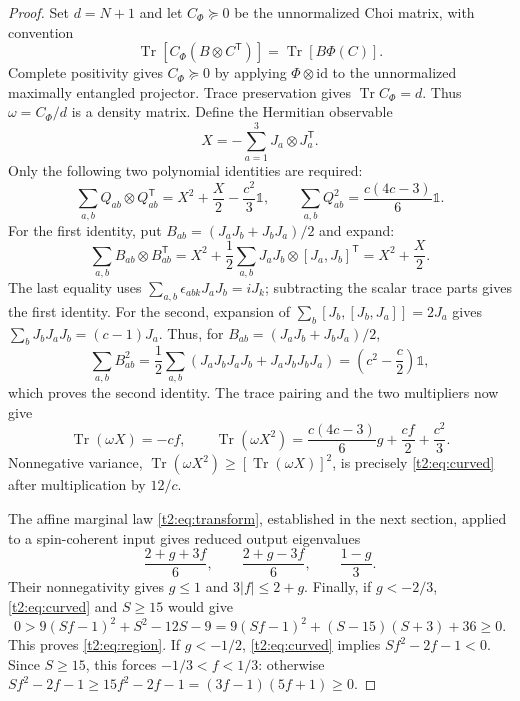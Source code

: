 \documentclass[11pt,a4paper]{article}
\newcommand{\Tr}{\operatorname{Tr}}
\newcommand{\id}{\mathds{1}}
\begin{document}
\begin{proof}
Set $d=N+1$ and let $C_\Phi\succeq0$ be the unnormalized Choi
matrix, with convention
\begin{equation}\label{t2:eq:choi-trace}
 \Tr[C_\Phi(B\otimes C^{\mathsf T})]=\Tr[B\Phi(C)].
\end{equation}
Complete positivity gives $C_\Phi\succeq0$ by applying
$\Phi\otimes\mathrm{id}$ to the unnormalized maximally entangled
projector. Trace preservation gives $\Tr C_\Phi=d$.
Thus $\omega=C_\Phi/d$ is a density matrix.
Define the Hermitian observable
\[
 X=-\sum_{a=1}^3J_a\otimes J_a^{\mathsf T}.
\]
Only the following two polynomial identities are required:
\begin{equation}\label{t2:eq:quadrupole}
 \sum_{a,b}Q_{ab}\otimes Q_{ab}^{\mathsf T}
 =X^2+\frac X2-\frac{c^2}3\id,
 \qquad
 \sum_{a,b}Q_{ab}^2=\frac{c(4c-3)}6\id.
\end{equation}
For the first identity, put $B_{ab}=(J_aJ_b+J_bJ_a)/2$ and expand:
\[
 \sum_{a,b}B_{ab}\otimes B_{ab}^{\mathsf T}
 =X^2+\frac12\sum_{a,b}J_aJ_b\otimes[J_a,J_b]^{\mathsf T}
 =X^2+\frac X2.
\]
The last equality uses $\sum_{a,b}\epsilon_{abk}J_aJ_b=iJ_k$;
subtracting the scalar trace parts gives the first identity.
For the second, expansion of
$\sum_b[J_b,[J_b,J_a]]=2J_a$ gives
$\sum_bJ_bJ_aJ_b=(c-1)J_a$. Thus, for
$B_{ab}=(J_aJ_b+J_bJ_a)/2$,
\[
 \sum_{a,b}B_{ab}^2
 =\frac12\sum_{a,b}(J_aJ_bJ_aJ_b+J_aJ_bJ_bJ_a)
 =\left(c^2-\frac c2\right)\id,
\]
which proves the second identity.
The trace pairing and the two multipliers now give
\[
 \Tr(\omega X)=-cf,\qquad
 \Tr(\omega X^2)=\frac{c(4c-3)}6g+\frac{cf}{2}+\frac{c^2}{3}.
\]
Nonnegative variance,
$\Tr(\omega X^2)\ge[\Tr(\omega X)]^2$, is precisely
\eqref{t2:eq:curved} after multiplication by $12/c$.

The affine marginal law \eqref{t2:eq:transform}, established in the next
section, applied to a spin-coherent input gives reduced output
eigenvalues
\[
 \frac{2+g+3f}{6},\qquad \frac{2+g-3f}{6},\qquad\frac{1-g}{3}.
\]
Their nonnegativity gives $g\le1$ and $3|f|\le2+g$.
Finally, if $g<-2/3$, \eqref{t2:eq:curved} and $S\ge15$ would give
\[
 0>9(Sf-1)^2+S^2-12S-9
   =9(Sf-1)^2+(S-15)(S+3)+36\ge0.
\]
This proves \eqref{t2:eq:region}. If $g<-1/2$,
\eqref{t2:eq:curved} implies $Sf^2-2f-1<0$.
Since $S\ge15$, this forces $-1/3<f<1/3$: otherwise
$Sf^2-2f-1\ge15f^2-2f-1=(3f-1)(5f+1)\ge0$.
\end{proof}
\end{document}
